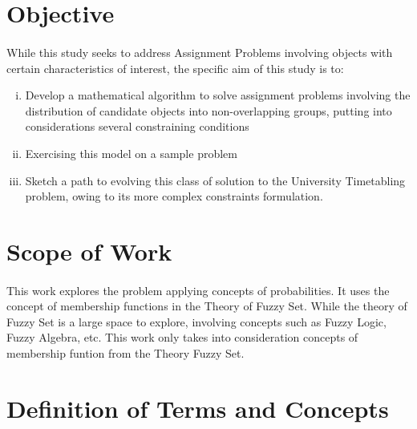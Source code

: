 \documentclass[a4paper,openany]{book}
\begin{document}
		\section{Objective}
            \paragraph{}
                While this study seeks to address Assignment Problems involving objects with certain characteristics of interest, the specific aim of this study is to:
                \begin{enumerate}[(i)]
                    \item Develop a mathematical algorithm to solve assignment problems involving the distribution of candidate objects into non-overlapping groups, putting into considerations several constraining conditions
                    \item Exercising this model on a sample problem
                    \item Sketch a path to evolving this class of solution to the University Timetabling problem, owing to its more complex constraints formulation.
				\end{enumerate}        
		\section{Scope of Work}
			\paragraph{}
			This work explores the problem applying concepts of probabilities. It uses the concept of membership functions in the Theory of Fuzzy Set. While the theory of Fuzzy Set is a large space to explore, involving concepts such as Fuzzy Logic, Fuzzy Algebra, etc. This work only takes into consideration concepts of membership funtion from the Theory Fuzzy Set.
		\section{Definition of Terms and Concepts}
\end{document}
